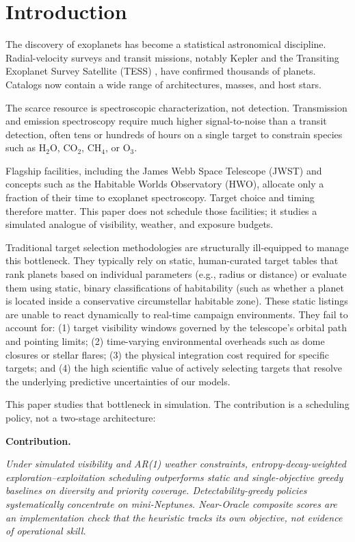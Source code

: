 \documentclass[11pt,a4paper]{article}
\newenvironment{noveltybox}
  {\begin{lrbox}{\noveltySaveBox}\begin{minipage}{\dimexpr\textwidth-2\fboxsep-2\fboxrule\relax}}
  {\end{minipage}\end{lrbox}\begin{center}\fcolorbox{tealaccent}{tealaccent!5}{\usebox{\noveltySaveBox}}\end{center}}
\begin{document}
\newpage

\section{Introduction}
\label{sec:intro}

The discovery of exoplanets has become a statistical astronomical discipline. Radial-velocity surveys and transit missions, notably Kepler and the Transiting Exoplanet Survey Satellite (TESS) \cite{barclay2018}, have confirmed thousands of planets. Catalogs now contain a wide range of architectures, masses, and host stars.

The scarce resource is spectroscopic characterization, not detection. Transmission and emission spectroscopy require much higher signal-to-noise than a transit detection, often tens or hundreds of hours on a single target to constrain species such as $\mathrm{H_2O}$, $\mathrm{CO_2}$, $\mathrm{CH_4}$, or $\mathrm{O_3}$.

Flagship facilities, including the James Webb Space Telescope (JWST) and concepts such as the Habitable Worlds Observatory (HWO), allocate only a fraction of their time to exoplanet spectroscopy. Target choice and timing therefore matter. This paper does not schedule those facilities; it studies a simulated analogue of visibility, weather, and exposure budgets.

Traditional target selection methodologies are structurally ill-equipped to manage this bottleneck. They typically rely on static, human-curated target tables that rank planets based on individual parameters (e.g., radius or distance) or evaluate them using static, binary classifications of habitability (such as whether a planet is located inside a conservative circumstellar habitable zone). These static listings are unable to react dynamically to real-time campaign environments. They fail to account for: (1) target visibility windows governed by the telescope's orbital path and pointing limits; (2) time-varying environmental overheads such as dome closures or stellar flares; (3) the physical integration cost required for specific targets; and (4) the high scientific value of actively selecting targets that resolve the underlying predictive uncertainties of our models.

This paper studies that bottleneck in simulation. The contribution is a scheduling policy, not a two-stage architecture:

\begin{noveltybox}
\centering
\textbf{Contribution.}
\smallskip

\textit{Under simulated visibility and AR(1) weather constraints, entropy-decay-weighted exploration--exploitation scheduling outperforms static and single-objective greedy baselines on diversity and priority coverage. Detectability-greedy policies systematically concentrate on mini-Neptunes. Near-Oracle composite scores are an implementation check that the heuristic tracks its own objective, not evidence of operational skill.}
\end{noveltybox}
\end{document}
